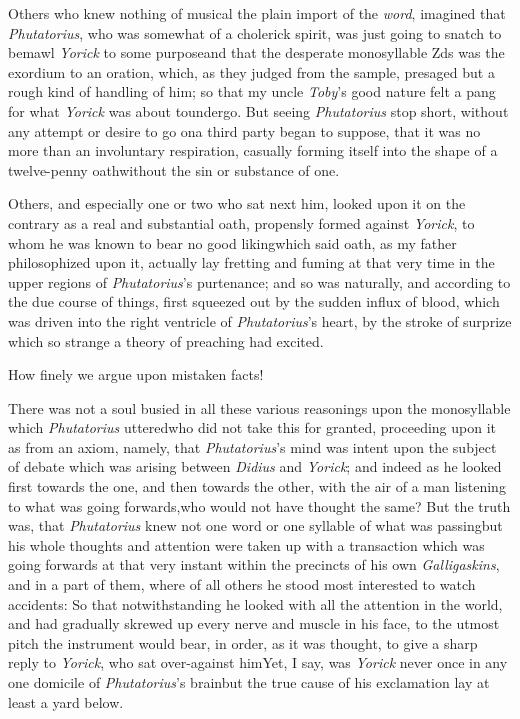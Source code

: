 \documentclass{article}
\begin{document}
Others who knew nothing of musical\break 
{}
the plain import of the \textit{word}, imagined that
\textit{Phutatorius}, who was somewhat of a cholerick spirit, was
just going to snatch  to bemawl \textit{Yorick} to some purpose\tsk and
that the desperate monosyllable Z\tsh ds was the exordium
to an oration, which, as they judged from the sample, presaged but
a rough kind of handling of him;\break 
so that my uncle \textit{Toby}’s good nature felt\break
a pang for what \textit{Yorick} was about to\break undergo. But seeing \textit{Phutatorius} stop short,
without any attempt or desire to go on\tsk a third party began to
suppose,
that it was no more than an involuntary respiration,
casually forming itself into the shape of a twelve-penny
oath\tsk without the sin or substance of one.

Others, and especially one or two who sat next him, looked
upon it on the contrary as a real and substantial oath,
pro\-pensly formed against \textit{Yorick}, to whom he was
known to bear no good liking\tsk\break which said oath, as my
father philosophized upon it, actually lay fretting and
fuming at that very time in the upper regions of
\textit{Phutatorius}’s purtenance; and so was naturally, and
according to the due course of things, first squeezed out by
the sudden influx of blood, which was driven into the right
ventricle of \textit{Phutatorius}’s heart, by the stroke of
surprize which so strange a theory of preaching had excited.

How finely we argue upon mistaken facts!

There was not a soul busied in all these various reasonings upon
the monosyllable which \textit{Phutatorius} uttered\tsk who did not
take this for granted, proceeding upon it as from an axiom, namely,
that \textit{Phutatorius}’s mind was intent upon the subject of debate which was arising between
\textit{Didius} and \textit{Yorick}; and indeed as he looked first
towards the one, and then towards the other, with the air of a man
listening to what was going forwards,\tsk who would not have
thought the same? But the truth was, that \textit{Phutatorius} knew
not one word or one syllable of what was passing\tsk but his
whole thoughts and attention were taken up with a transaction which
was going forwards at that very instant within the precincts of his
own \textit{Galligaskins}, and in a part of them, where of all others
he stood most interested to watch accidents: So that
notwithstanding he looked with all the attention in the world, and
had gradually skrewed up every nerve and muscle in his face, to the
utmost pitch the instrument would bear, in order, as it was
thought, to give a sharp reply to \textit{Yorick}, who sat
over-against him\tsk Yet, I say, was \textit{Yorick} never
once in any one domicile of \textit{Phutatorius}’s
brain\tsk but the true cause of his exclamation lay at
least a yard below.
\end{document}
